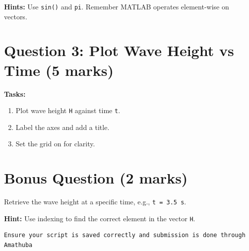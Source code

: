 \documentclass[12pt]{article}
\begin{document}
\textbf{Hints:} Use \verb|sin()| and \verb|pi|. Remember MATLAB operates element-wise on vectors.


\section*{Question 3: Plot Wave Height vs Time (5 marks)}
\textbf{Tasks:}
\begin{enumerate}
    \item Plot wave height \texttt{H} against time \texttt{t}.
    \item Label the axes and add a title.
    \item Set the grid on for clarity.
\end{enumerate}

\section*{Bonus Question (2 marks)}
Retrieve the wave height at a specific time, e.g., \texttt{t = 3.5 s}.

\textbf{Hint:} Use indexing to find the correct element in the vector \texttt{H}.

\begin{verbatim}
Ensure your script is saved correctly and submission is done through Amathuba
\end{verbatim}
\end{document}
